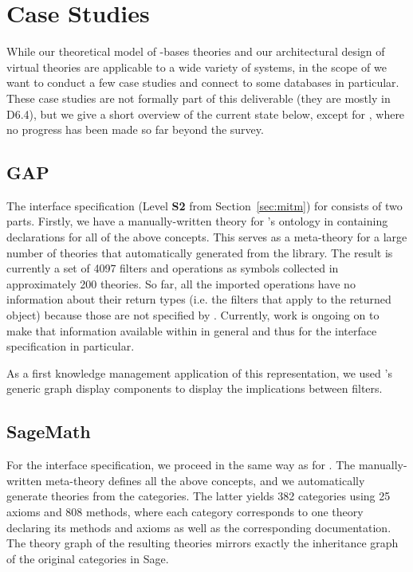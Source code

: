 \section{Case Studies}\label{sec:cases}

While our theoretical model of \DKS-bases theories and our architectural design of virtual theories are applicable to a wide variety of systems, in the scope of \pn we want to conduct a few case studies and connect to some databases in particular.
These case studies are not formally part of this deliverable (they are mostly in D6.4), but we give a short overview of the current state below, except for \FindStat, where no progress has been made so far beyond the survey.

\subsection{GAP}\label{sec:gap}

The interface specification (Level \textbf{S2} from Section~\ref{sec:mitm}) for \GAP consists of two parts.
Firstly, we have a manually-written theory for \GAP's ontology in \MMT containing declarations for all of the above concepts.
This serves as a meta-theory for a large number of theories that automatically generated from the \GAP library.
The result is currently a set of 4097 filters and operations as \MMT symbols collected in approximately 200 theories.
So far, all the imported operations have no information about their return types (i.e. the filters that apply to the returned object) because those are not specified by \GAP.
Currently, work is ongoing on \GAP to make that information available within \GAP in general and thus for the interface specification in particular.

As a first knowledge management application of this representation, we used \MMT's generic graph display components to display the implications between \GAP filters.

\subsection{SageMath}\label{sec:sage}

For the interface specification, we proceed in the same way as for \GAP.
The manually-written meta-theory defines all the above concepts, and we automatically generate theories from the \SageMath categories.
The latter yields 382 categories using 25 axioms and 808 methods, where each category corresponds to one \MMT theory declaring its methods and axioms as well as the corresponding documentation.
The theory graph of the resulting theories mirrors exactly the inheritance graph of the original categories in Sage.

